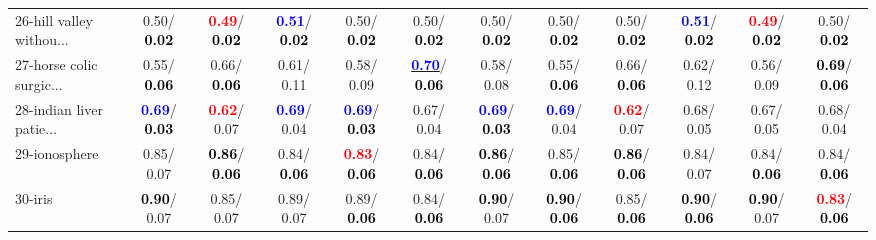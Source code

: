 \begin{table}[h]
\begin{center}
{\begin{tabular}{lc|c|c|c|c|c|c|c|c|c|c}
26-hill valley withou... &   0.50/\textcolor{black}{\textbf{  0.02}} & \textcolor{red}{\textbf{  0.49}}/\textcolor{black}{\textbf{  0.02}} & \textcolor{blue}{\textbf{  0.51}}/\textcolor{black}{\textbf{  0.02}} &   0.50/\textcolor{black}{\textbf{  0.02}} &   0.50/\textcolor{black}{\textbf{  0.02}} &   0.50/\textcolor{black}{\textbf{  0.02}} &   0.50/\textcolor{black}{\textbf{  0.02}} &   0.50/\textcolor{black}{\textbf{  0.02}} & \textcolor{blue}{\textbf{  0.51}}/\textcolor{black}{\textbf{  0.02}} & \textcolor{red}{\textbf{  0.49}}/\textcolor{black}{\textbf{  0.02}} &   0.50/\textcolor{black}{\textbf{  0.02}} \\
27-horse colic surgic... &   0.55/\textcolor{black}{\textbf{  0.06}} &   0.66/\textcolor{black}{\textbf{  0.06}} &   0.61/  0.11 &   0.58/  0.09 & \underline{\textcolor{blue}{\textbf{  0.70}}}/\textcolor{black}{\textbf{  0.06}} &   0.58/  0.08 &   0.55/\textcolor{black}{\textbf{  0.06}} &   0.66/\textcolor{black}{\textbf{  0.06}} &   0.62/  0.12 &   0.56/  0.09 & \textcolor{black}{\textbf{  0.69}}/\textcolor{black}{\textbf{  0.06}} \\
28-indian liver patie... & \textcolor{blue}{\textbf{  0.69}}/\textcolor{black}{\textbf{  0.03}} & \textcolor{red}{\textbf{  0.62}}/  0.07 & \textcolor{blue}{\textbf{  0.69}}/  0.04 & \textcolor{blue}{\textbf{  0.69}}/\textcolor{black}{\textbf{  0.03}} &   0.67/  0.04 & \textcolor{blue}{\textbf{  0.69}}/\textcolor{black}{\textbf{  0.03}} & \textcolor{blue}{\textbf{  0.69}}/  0.04 & \textcolor{red}{\textbf{  0.62}}/  0.07 &   0.68/  0.05 &   0.67/  0.05 &   0.68/  0.04 \\ \hline
29-ionosphere &   0.85/  0.07 & \textcolor{black}{\textbf{  0.86}}/\textcolor{black}{\textbf{  0.06}} &   0.84/\textcolor{black}{\textbf{  0.06}} & \textcolor{red}{\textbf{  0.83}}/\textcolor{black}{\textbf{  0.06}} &   0.84/\textcolor{black}{\textbf{  0.06}} & \textcolor{black}{\textbf{  0.86}}/\textcolor{black}{\textbf{  0.06}} &   0.85/\textcolor{black}{\textbf{  0.06}} & \textcolor{black}{\textbf{  0.86}}/\textcolor{black}{\textbf{  0.06}} &   0.84/  0.07 &   0.84/\textcolor{black}{\textbf{  0.06}} &   0.84/\textcolor{black}{\textbf{  0.06}} \\
30-iris & \textcolor{black}{\textbf{  0.90}}/  0.07 &   0.85/  0.07 &   0.89/  0.07 &   0.89/\textcolor{black}{\textbf{  0.06}} &   0.84/\textcolor{black}{\textbf{  0.06}} & \textcolor{black}{\textbf{  0.90}}/  0.07 & \textcolor{black}{\textbf{  0.90}}/\textcolor{black}{\textbf{  0.06}} &   0.85/\textcolor{black}{\textbf{  0.06}} & \textcolor{black}{\textbf{  0.90}}/\textcolor{black}{\textbf{  0.06}} & \textcolor{black}{\textbf{  0.90}}/  0.07 & \textcolor{red}{\textbf{  0.83}}/\textcolor{black}{\textbf{  0.06}} \\

\end{tabular}}
\end{center}
\end{table}

